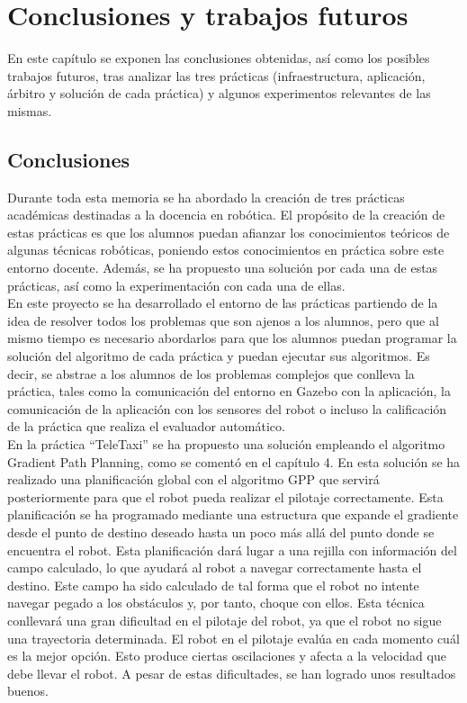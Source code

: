 \chapter{Conclusiones y trabajos futuros}\label{cap.conclusiones}
En este capítulo se exponen las conclusiones obtenidas, así como los posibles trabajos futuros, tras analizar las tres prácticas (infraestructura, aplicación, árbitro y solución de cada práctica) y algunos experimentos relevantes de las mismas.

\section{Conclusiones}
Durante toda esta memoria se ha abordado la creación de tres prácticas académicas destinadas a la docencia en robótica. El propósito de la creación de estas prácticas es que los alumnos puedan afianzar los conocimientos teóricos de algunas técnicas robóticas, poniendo estos conocimientos en práctica sobre este entorno docente. Además, se ha propuesto una solución por cada una de estas prácticas, así como la experimentación con cada una de ellas.\\

En este proyecto se ha desarrollado el entorno de las prácticas partiendo de la idea de resolver todos los problemas que son ajenos a los alumnos, pero que al mismo tiempo es necesario abordarlos para que los alumnos puedan programar la solución del algoritmo de cada práctica y puedan ejecutar sus algoritmos. Es decir, se abstrae a los alumnos de los problemas complejos que conlleva la práctica, tales como la comunicación del entorno en Gazebo con la aplicación, la comunicación de la aplicación con los sensores del robot o incluso la calificación de la práctica que realiza el evaluador automático.\\

En la práctica ``TeleTaxi'' se ha propuesto una solución empleando el algoritmo Gradient Path Planning, como se comentó en el capítulo 4. En esta solución se ha realizado una planificación global con el algoritmo GPP que servirá posteriormente para que el robot pueda realizar el pilotaje correctamente. Esta planificación se ha programado mediante una estructura que expande el gradiente desde el punto de destino deseado hasta un poco más allá del punto donde se encuentra el robot. Esta planificación dará lugar a una rejilla con información del campo calculado, lo que ayudará al robot a navegar correctamente hasta el destino. Este campo ha sido calculado de tal forma que el robot no intente navegar pegado a los obstáculos y, por tanto, choque con ellos. Esta técnica conllevará una gran dificultad en el pilotaje del robot, ya que el robot no sigue una trayectoria determinada. El robot en el pilotaje evalúa en cada momento cuál es la mejor opción. Esto produce ciertas oscilaciones y afecta a la velocidad que debe llevar el robot. A pesar de estas dificultades, se han logrado unos resultados buenos. \\

